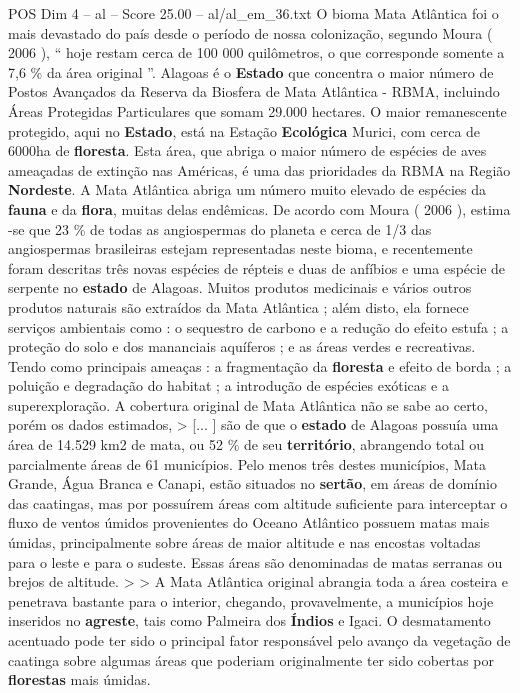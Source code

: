 \begin{textsample}{POS Dim 4 – al – Score 25.00 – al/al\_em\_36.txt}
O bioma Mata Atlântica foi o mais devastado do país desde o período de nossa colonização, segundo Moura ( 2006 ), “ hoje restam cerca de 100 000 quilômetros, o que corresponde somente a 7,6 \% da área original ”.
Alagoas é o \textbf{Estado} que concentra o maior número de Postos Avançados da Reserva da Biosfera de Mata Atlântica - RBMA, incluindo Áreas Protegidas Particulares que somam 29.000 hectares.
O maior remanescente protegido, aqui no \textbf{Estado}, está na Estação \textbf{Ecológica} Murici, com cerca de 6000ha de \textbf{floresta}.
Esta área, que abriga o maior número de espécies de aves ameaçadas de extinção nas Américas, é uma das prioridades da RBMA na Região \textbf{Nordeste}.
A Mata Atlântica abriga um número muito elevado de espécies da \textbf{fauna} e da \textbf{flora}, muitas delas endêmicas.
De acordo com Moura ( 2006 ), estima -se que 23 \% de todas as angiospermas do planeta e cerca de 1/3 das angiospermas brasileiras estejam representadas neste bioma, e recentemente foram descritas três novas espécies de répteis e duas de anfíbios e uma espécie de serpente no \textbf{estado} de Alagoas.
Muitos produtos medicinais e vários outros produtos naturais são extraídos da Mata Atlântica ; além disto, ela fornece serviços ambientais como : o sequestro de carbono e a redução do efeito estufa ; a proteção do solo e dos mananciais aquíferos ; e as áreas verdes e recreativas.
Tendo como principais ameaças : a fragmentação da \textbf{floresta} e efeito de borda ; a poluição e degradação do habitat ; a introdução de espécies exóticas e a superexploração.
A cobertura original de Mata Atlântica não se sabe ao certo, porém os dados estimados, > [... ] são de que o \textbf{estado} de Alagoas possuía uma área de 14.529 km2 de mata, ou 52 \% de seu \textbf{território}, abrangendo total ou parcialmente áreas de 61 municípios.
Pelo menos três destes municípios, Mata Grande, Água Branca e Canapi, estão situados no \textbf{sertão}, em áreas de domínio das caatingas, mas por possuírem áreas com altitude suficiente para interceptar o fluxo de ventos úmidos provenientes do Oceano Atlântico possuem matas mais úmidas, principalmente sobre áreas de maior altitude e nas encostas voltadas para o leste e para o sudeste.
Essas áreas são denominadas de matas serranas ou brejos de altitude. > > A Mata Atlântica original abrangia toda a área costeira e penetrava bastante para o interior, chegando, provavelmente, a municípios hoje inseridos no \textbf{agreste}, tais como Palmeira dos \textbf{Índios} e Igaci.
O desmatamento acentuado pode ter sido o principal fator responsável pelo avanço da vegetação de caatinga sobre algumas áreas que poderiam originalmente ter sido cobertas por \textbf{florestas} mais úmidas.

\end{textsample}
